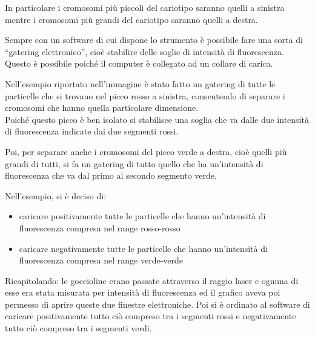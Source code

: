 \documentclass[11pt]{book}
\begin{document}
In particolare i cromosomi più piccoli del cariotipo saranno quelli a sinistra mentre i cromosomi più grandi del cariotipo saranno quelli a destra.

Sempre con un software di cui dispone lo strumento è possibile fare una sorta di ``gatering elettronico'', cioè stabilire delle soglie di intensità di fluorescenza.\\
Questo è possibile poiché il computer è collegato ad un collare di carica.

Nell’esempio riportato nell’immagine è stato fatto un gatering di tutte le particelle che si trovano nel picco rosso a sinistra, consentendo di separare i cromosomi che hanno quella particolare dimensione.\\
Poiché questo picco è ben isolato si stabilisce una soglia che va dalle due intensità di fluorescenza indicate dai due segmenti rossi.

Poi, per separare anche i cromosomi del picco verde a destra, cioè quelli più grandi di tutti, si fa un gatering di tutto quello che ha un’intensità di fluorescenza che va dal primo al secondo segmento verde.

Nell’esempio, si è deciso di:
\begin{itemize}
\item caricare positivamente tutte le particelle che hanno un’intensità di fluorescenza compresa nel range rosso-rosso 
\item caricare negativamente tutte le particelle che hanno un’intensità di fluorescenza compresa nel range verde-verde
\end{itemize}

Ricapitolando: le goccioline erano passate attraverso il raggio laser e ognuna di esse era stata misurata per intensità di fluorescenza ed il grafico aveva poi permesso di aprire queste due finestre elettroniche.
Poi si è ordinato al software di caricare positivamente tutto ciò compreso tra i segmenti rossi e negativamente tutto ciò compreso tra i segmenti verdi.
\end{document}
